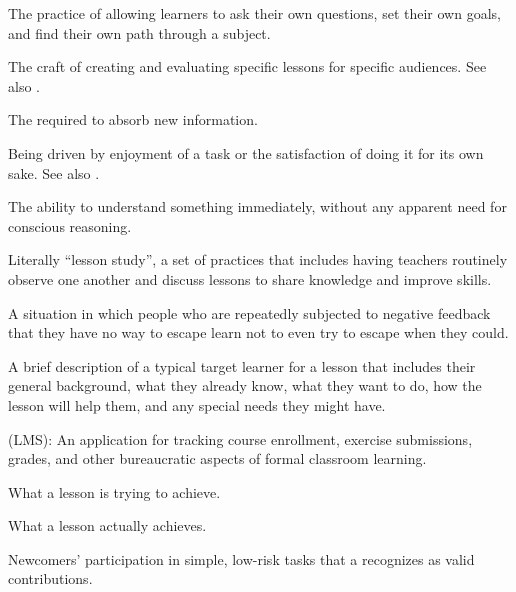 \begin{description}
 The practice of
allowing learners to ask their own questions, set their own goals, and find
their own path through a subject.

 The craft of creating and
evaluating specific lessons for specific audiences. See also
.

 The 
required to absorb new information.

 Being driven by enjoyment
of a task or the satisfaction of doing it for its own sake.  See also
.

 The ability to understand something immediately,
without any apparent need for conscious reasoning.

 Literally ``lesson study'', a set of
practices that includes having teachers routinely observe one another and
discuss lessons to share knowledge and improve skills.

 A situation in which
people who are repeatedly subjected to negative feedback that they have no way
to escape learn not to even try to escape when they could.

 A brief description of a typical
target learner for a lesson that includes their general background, what they
already know, what they want to do, how the lesson will help them, and any
special needs they might have.

 (LMS): An application for tracking course
enrollment, exercise submissions, grades, and other bureaucratic aspects of
formal classroom learning.

 What a lesson is trying to
achieve.

 What a lesson actually achieves.

 Newcomers' participation in simple, low-risk tasks that a
 recognizes as valid contributions.


\end{description}
